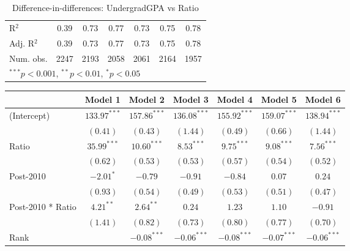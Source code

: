\begin{table}
\begin{center}
\begin{tabular}{l c c c c c c }
\hline
R$^2$                 & 0.39         & 0.73          & 0.77          & 0.73          & 0.75          & 0.78          \\
Adj. R$^2$            & 0.39         & 0.73          & 0.77          & 0.73          & 0.75          & 0.78          \\
Num. obs.             & 2247         & 2193          & 2058          & 2061          & 2164          & 1957          \\
\hline
\multicolumn{7}{l}{\scriptsize{$^{***}p<0.001$, $^{**}p<0.01$, $^*p<0.05$}}
\end{tabular}
\caption{Difference-in-differences: UndergradGPA vs Ratio}
\label{tab:gpa-ratio}
\end{center}
\end{table}
\clearpage
\begin{table}
\begin{center}
\begin{tabular}{l c c c c c c }
\hline
                      & Model 1 & Model 2 & Model 3 & Model 4 & Model 5 & Model 6 \\
\hline
(Intercept)           & $133.97^{***}$ & $157.86^{***}$ & $136.08^{***}$ & $155.92^{***}$ & $159.07^{***}$ & $138.94^{***}$ \\
                      & $(0.41)$       & $(0.43)$       & $(1.44)$       & $(0.49)$       & $(0.66)$       & $(1.44)$       \\
Ratio                 & $35.99^{***}$  & $10.60^{***}$  & $8.53^{***}$   & $9.75^{***}$   & $9.08^{***}$   & $7.56^{***}$   \\
                      & $(0.62)$       & $(0.53)$       & $(0.53)$       & $(0.57)$       & $(0.54)$       & $(0.52)$       \\
Post-2010             & $-2.01^{*}$    & $-0.79$        & $-0.91$        & $-0.84$        & $0.07$         & $0.24$         \\
                      & $(0.93)$       & $(0.54)$       & $(0.49)$       & $(0.53)$       & $(0.51)$       & $(0.47)$       \\
Post-2010 * Ratio     & $4.21^{**}$    & $2.64^{**}$    & $0.24$         & $1.23$         & $1.10$         & $-0.91$        \\
                      & $(1.41)$       & $(0.82)$       & $(0.73)$       & $(0.80)$       & $(0.77)$       & $(0.70)$       \\
Rank                  &                & $-0.08^{***}$  & $-0.06^{***}$  & $-0.08^{***}$  & $-0.07^{***}$  & $-0.06^{***}$  \\

\end{tabular}
\end{center}
\end{table}
